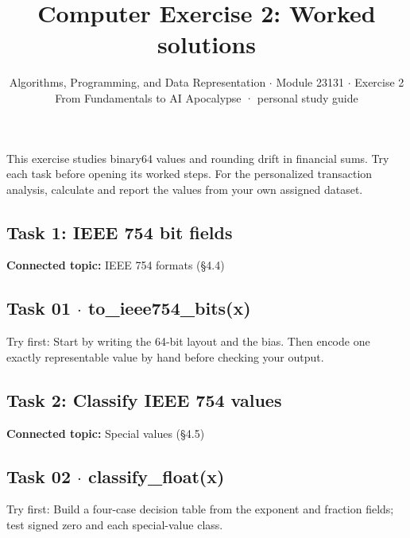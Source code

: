 \documentclass[11pt]{article}
\title{\sffamily\bfseries\color{FAUblue}Computer Exercise 2: Worked solutions}
\author{Algorithms, Programming, and Data Representation \ensuremath{\cdot} Module 23131 \ensuremath{\cdot} Exercise 2\\[2pt]\small From Fundamentals to AI Apocalypse · personal study guide}
\date{}
\begin{document}
\maketitle
\begingroup\footnotesize\setlength{\parskip}{0pt}\tableofcontents\endgroup
\clearpage

{\large This exercise studies binary64 values and rounding drift in financial sums. Try each task before opening its worked steps. For the personalized transaction analysis, calculate and report the values from your own assigned dataset.}


\begin{keepsection}
\section{Task 1: IEEE 754 bit fields}

\textbf{Connected topic:} IEEE 754 formats (§4.4)

\begin{keepsection}
\subsection{Task 01 \ensuremath{\cdot} to\_ieee754\_bits(x)}

Try first: Start by writing the 64-bit layout and the bias. Then encode one exactly representable value by hand before checking your output.

\end{keepsection}
\end{keepsection}

\begin{keepsection}
\section{Task 2: Classify IEEE 754 values}

\textbf{Connected topic:} Special values (§4.5)

\begin{keepsection}
\subsection{Task 02 \ensuremath{\cdot} classify\_float(x)}

Try first: Build a four-case decision table from the exponent and fraction fields; test signed zero and each special-value class.

\end{keepsection}
\end{keepsection}
\end{document}
